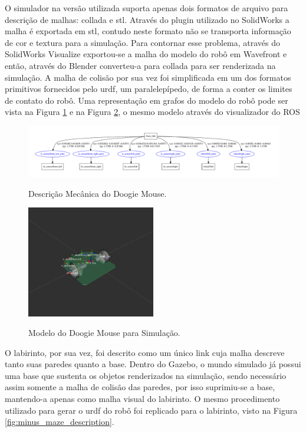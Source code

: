 O simulador na versão utilizada suporta apenas dois formatos de arquivo para descrição de malhas: \gls*{collada} e \gls*{stl}. Através do plugin utilizado no SolidWorks a malha é exportada em \gls*{stl}, contudo neste formato não se transporta informação de cor e textura para a simulação. Para contornar esse problema, através do SolidWorks Visualize exportou-se a malha do modelo do robô em Wavefront e então, através do Blender converteu-a para \gls*{collada} para ser renderizada na simulação. A malha de colisão por sua vez foi simplificada em um dos formatos primitivos fornecidos pelo \gls*{urdf}, um paralelepípedo, de forma a conter os limites de contato do robô. Uma representação em grafos do modelo do robô pode ser vista na Figura \ref{fig:doogie_description} e na Figura \ref{fig:doogie_description_model}, o mesmo modelo através do visualizador do ROS

\begin{figure}[H]
	\centering
	\caption{Descrição Mecânica do Doogie Mouse.}
	\includegraphics[width=1\textwidth]
	{Figures/doogie_description}
	\label{fig:doogie_description}
\end{figure}

\begin{figure}[H]
	\centering
	\caption{Modelo do Doogie Mouse para Simulação.}
	\includegraphics[width=0.5\textwidth]
	{Figures/doogie_description_model}
	\label{fig:doogie_description_model}
\end{figure}

O labirinto, por sua vez, foi descrito como um único link cuja malha descreve tanto suas paredes quanto a base. Dentro do Gazebo, o mundo simulado já possui uma base que sustenta os objetos renderizados na simulação, sendo necessário assim somente a malha de colisão das paredes, por isso suprimiu-se a base, mantendo-a apenas como malha visual do labirinto. O mesmo procedimento utilizado para gerar o \gls*{urdf} do robô foi replicado para o labirinto, visto na Figura \ref{fig:minus_maze_description}.

